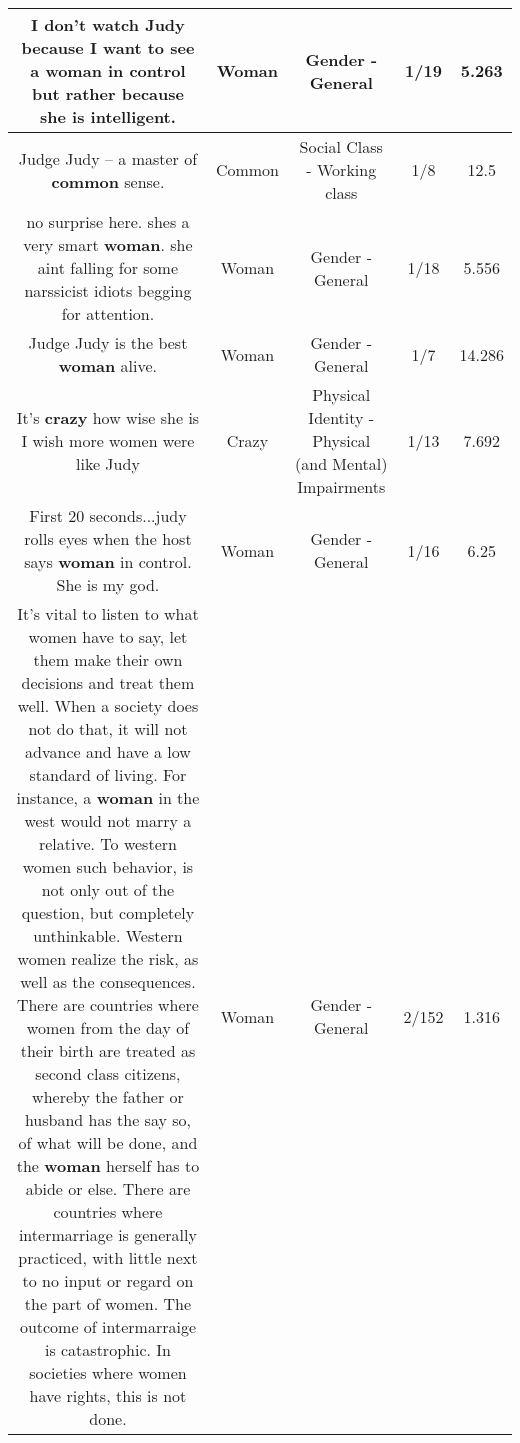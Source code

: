 \documentclass[11pt]{article}
\newlength\mylength
\begin{document}
\begin{center}
\begin{longtable}{|C{.65\mylength}|C{.30\mylength}|C{.12\mylength}|C{.12\mylength}|C{.12\mylength}|}
  \small I don't watch Judy because I want to see a \textbf{woman} in control but rather because she is intelligent.\normalsize   & Woman & Gender - General & 1/19 & 5.263 \\  \hline
  \small Judge Judy -- a master of \textbf{common} sense.\normalsize   & Common & Social Class - Working class & 1/8 & 12.5 \\  \hline
  \small no surprise here.  shes a very smart \textbf{woman}. she aint falling for some narssicist idiots begging for attention.\normalsize   & Woman & Gender - General & 1/18 & 5.556 \\  \hline
  \small Judge Judy is the best \textbf{woman} alive.\normalsize   & Woman & Gender - General & 1/7 & 14.286 \\  \hline
  \small It's \textbf{crazy} how wise she is I wish more women were like Judy\normalsize   & Crazy & Physical Identity - Physical (and Mental) Impairments & 1/13 & 7.692 \\  \hline
  \small First 20 seconds...judy rolls eyes when the host says \textbf{woman} in control. She is my god.\normalsize   & Woman & Gender - General & 1/16 & 6.25 \\  \hline
  \small It's vital to listen to what women have to say, let them make their own decisions and  treat them well.  When a society does not do that, it will not advance and have a low standard of living.   For instance,  a \textbf{woman} in the west would not marry a relative.  To western women such behavior, is not only out of the question, but completely unthinkable.  Western women realize the risk, as well as the consequences.  There are countries where women from the day of their birth are treated as second class citizens, whereby the father or husband has the say so, of what will be done, and the \textbf{woman} herself has to abide or else.  There are countries where intermarriage is generally practiced, with little next to no input or regard on the part of women.  The outcome of intermarraige is catastrophic.  In societies where women have rights, this is not done.\normalsize   & Woman & Gender - General & 2/152 & 1.316 \\  \hline

\end{longtable}
\end{center}
\end{document}

